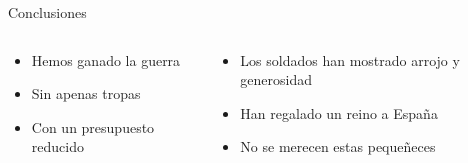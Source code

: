 \documentclass{beamer}
\begin{document}
\begin{frame}{Conclusiones}

\begin{columns}
\begin{column}{0.4\textwidth}
\begin{itemize}
\item Hemos ganado la guerra
\item Sin apenas tropas
\item Con un presupuesto reducido
\end{itemize}
\end{column}
\begin{column}{0.6\textwidth}
\begin{itemize}
\item Los soldados han mostrado arrojo y generosidad
\item Han regalado un reino a España
\item No se merecen estas pequeñeces
\end{itemize}
\end{column}
\end{columns}

\end{frame}
\end{document}
